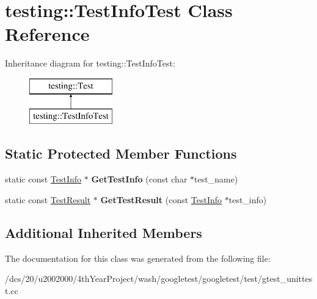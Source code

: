 \hypertarget{classtesting_1_1TestInfoTest}{}\section{testing\+:\+:Test\+Info\+Test Class Reference}
\label{classtesting_1_1TestInfoTest}
Inheritance diagram for testing\+:\+:Test\+Info\+Test\+:\begin{figure}[H]
\begin{center}
\leavevmode
\includegraphics[height=2.000000cm]{classtesting_1_1TestInfoTest}
\end{center}
\end{figure}
\subsection*{Static Protected Member Functions}
\begin{DoxyCompactItemize}
\item 
\mbox{\label{classtesting_1_1TestInfoTest_a4140c1302bf53c7f1375a23923624f04}} 
static const \mbox{\hyperlink{classtesting_1_1TestInfo}{Test\+Info}} $\ast$ {\bfseries Get\+Test\+Info} (const char $\ast$test\+\_\+name)
\item 
\mbox{\label{classtesting_1_1TestInfoTest_a154b3679b1aa00ad037ce46eb60d18c3}} 
static const \mbox{\hyperlink{classtesting_1_1TestResult}{Test\+Result}} $\ast$ {\bfseries Get\+Test\+Result} (const \mbox{\hyperlink{classtesting_1_1TestInfo}{Test\+Info}} $\ast$test\+\_\+info)
\end{DoxyCompactItemize}
\subsection*{Additional Inherited Members}


The documentation for this class was generated from the following file\+:\begin{DoxyCompactItemize}
\item 
/dcs/20/u2002000/4th\+Year\+Project/wash/googletest/googletest/test/gtest\+\_\+unittest.\+cc\end{DoxyCompactItemize}
